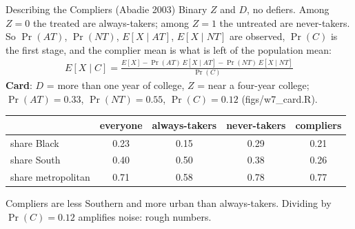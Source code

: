 \documentclass[aspectratio=169,11pt,xcolor=dvipsnames]{beamer}
\newcommand{\srcp}[1]{{\scriptsize\color{gray}(#1)}}
\newcommand{\E}{E}
\begin{document}
\begin{frame}{Describing the Compliers \srcp{Abadie 2003}}
Binary $Z$ and $D$, no defiers. Among $Z = 0$ the treated are always-takers;
among $Z = 1$ the untreated are never-takers. So $\Pr(AT)$, $\Pr(NT)$,
$\E[X \mid AT]$, $\E[X \mid NT]$ are observed, $\Pr(C)$ is the first stage,
and the complier mean is what is left of the population mean:
\begin{align*}
  \E[X \mid C] = \frac{\E[X] - \Pr(AT)\,\E[X \mid AT] - \Pr(NT)\,\E[X \mid NT]}{\Pr(C)}
\end{align*}
\vskip-2pt
\textbf{Card}: $D$ = more than one year of college, $Z$ = near a four-year
college; $\Pr(AT) = 0.33$, $\Pr(NT) = 0.55$, $\Pr(C) = 0.12$ \srcp{figs/w7\_card.R}.
\vskip-3pt
\begin{center}\small
\renewcommand{\arraystretch}{1.0}
\begin{tabular}{@{}lcccc@{}}
\toprule
 & everyone & always-takers & never-takers & compliers \\
\midrule
share Black & 0.23 & 0.15 & 0.29 & 0.21 \\
share South & 0.40 & 0.50 & 0.38 & 0.26 \\
share metropolitan & 0.71 & 0.58 & 0.78 & 0.77 \\
\bottomrule
\end{tabular}
\end{center}
\vskip-2pt
Compliers are less Southern and more urban than always-takers. Dividing by
$\Pr(C) = 0.12$ amplifies noise: rough numbers.
\end{frame}
\end{document}
